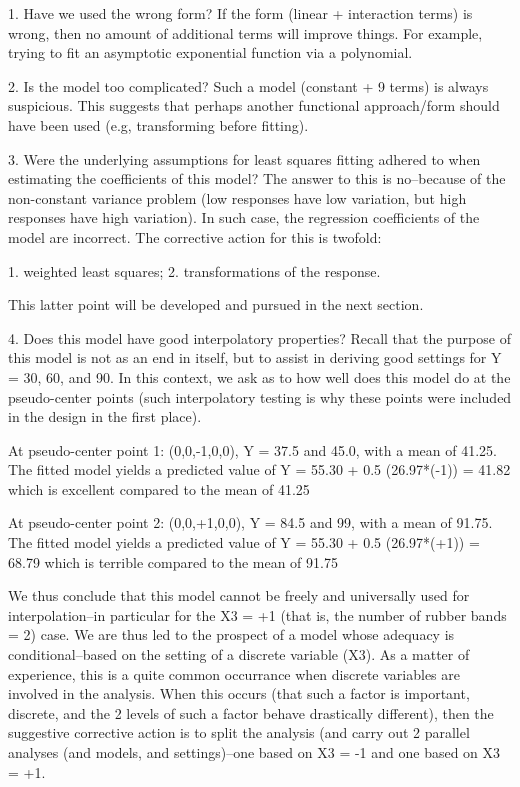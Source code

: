    1. Have we used the wrong form?  If the form (linear
      + interaction terms) is wrong, then no amount of
      additional terms will improve things.  For
      example, trying to fit an asymptotic exponential
      function via a polynomial.

   2. Is the model too complicated?  Such a model
      (constant + 9 terms) is always suspicious.  This
      suggests that perhaps another functional
      approach/form should have been used (e.g,
      transforming before fitting).

   3. Were the underlying assumptions for least squares
      fitting adhered to when estimating the
      coefficients of this model?  The answer to this
      is no--because of the non-constant variance
      problem (low responses have low variation, but
      high responses have high variation).  In such
      case, the regression coefficients of the model
      are incorrect.  The corrective action for this is
      twofold:

         1. weighted least squares;
         2. transformations of the response.

      This latter point will be developed and pursued
      in the next section.

   4. Does this model have good interpolatory
      properties?  Recall that the purpose of this
      model is not as an end in itself, but to assist
      in deriving good settings for Y = 30, 60, and 90.
      In this context, we ask as to how well does this
      model do at the pseudo-center points (such
      interpolatory testing is why these points were
      included in the design in the first place).

         At pseudo-center point 1: (0,0,-1,0,0), Y = 37.5 and 45.0,
            with a mean of 41.25.
            The fitted model yields a predicted value of
            Y = 55.30 + 0.5 (26.97*(-1)) = 41.82
            which is excellent compared to the mean of 41.25

         At pseudo-center point 2: (0,0,+1,0,0), Y = 84.5 and 99,
            with a mean of 91.75.
            The fitted model yields a predicted value of
            Y = 55.30 + 0.5 (26.97*(+1)) = 68.79
            which is terrible compared to the mean of 91.75

      We thus conclude that this model cannot be freely
      and universally used for interpolation--in
      particular for the X3 = +1 (that is, the number
      of rubber bands = 2) case.  We are thus led to
      the prospect of a model whose adequacy is
      conditional--based on the setting of a discrete
      variable (X3).  As a matter of experience, this
      is a quite common occurrance when discrete
      variables are involved in the analysis.  When
      this occurs (that such a factor is important,
      discrete, and the 2 levels of such a factor
      behave drastically different), then the
      suggestive corrective action is to split the
      analysis (and carry out 2 parallel analyses (and
      models, and settings)--one based on X3 = -1 and
      one based on X3 = +1.

